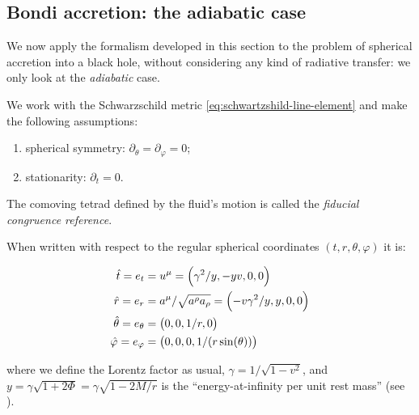 \documentclass[main.tex]{subfiles}
\begin{document}
\subsection{Bondi accretion: the adiabatic case}

We now apply the formalism developed in this section to the problem of spherical accretion into a black hole, without considering any kind of radiative transfer: we only look at the \emph{adiabatic} case.

We work with the Schwarzschild metric \eqref{eq:schwartzshild-line-element} and make the following assumptions:

\begin{enumerate}
  \item spherical symmetry: \(\partial_\theta = \partial_\varphi = 0\);
  \item stationarity: \(\partial_t = 0\).
\end{enumerate}

The comoving tetrad defined by the fluid's motion is called the \emph{fiducial congruence reference}.

\begin{claim}
When written with respect to the regular spherical coordinates \((t, r, \theta, \varphi)\) it is:

\begin{subequations} \label{eq:fiducial-frame}
    \begin{align}
        \hat{t} = e_t &= u^\mu = \qty(\gamma^2 / y, -yv, 0,0)  \\
        \hat{r} = e_r &= a^\mu / \sqrt{a^\rho a_\rho} = \qty(-v \gamma^2 /y, y, 0, 0) \\
        \hat{\theta} =  e_\theta &= \qty(0,0, 1/r, 0)  \\
        \hat{\varphi} =  e_ \varphi &= \qty(0,0,0, 1/(r \sin(\theta)))
    \end{align}
\end{subequations}

where we define the Lorentz factor as usual, $\gamma = 1/\sqrt{1-v^2}$, and $y=\gamma \sqrt{1+2\Phi} = \gamma \sqrt{1 - 2M/r} $ is the ``energy-at-infinity per unit rest mass'' (see \cite[equation 3]{ThorneFLammmangZytkow:1981feb}).
\end{claim}
\end{document}
